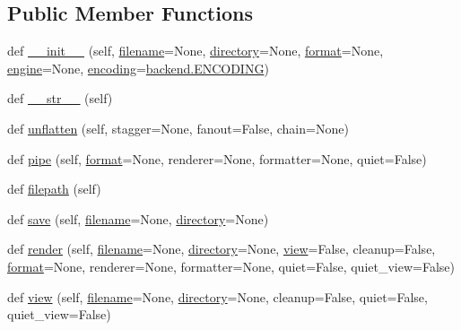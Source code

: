 \subsection*{Public Member Functions}
\begin{DoxyCompactItemize}
\item 
def \hyperlink{classgraphviz_1_1files_1_1File_a84665997ab9877bbfe2fb7cb85f38425}{\+\_\+\+\_\+init\+\_\+\+\_\+} (self, \hyperlink{classgraphviz_1_1files_1_1File_ad8357bf1553bf74f1d05954c0a0986a8}{filename}=None, \hyperlink{classgraphviz_1_1files_1_1File_a17fd3abb3628eca94effe35cf1237a73}{directory}=None, \hyperlink{classgraphviz_1_1files_1_1File_acd2dce8967c8ff4c00ad6c47872dc340}{format}=None, \hyperlink{classgraphviz_1_1files_1_1File_aabc771621d8e81fccc4003231716e9cf}{engine}=None, \hyperlink{classgraphviz_1_1files_1_1File_aec4aaf697774bce61c327584985eb42b}{encoding}=\hyperlink{namespacegraphviz_1_1backend_aaa5c3555a484c96a0b0e5356ce3a577d}{backend.\+E\+N\+C\+O\+D\+I\+NG})
\item 
def \hyperlink{classgraphviz_1_1files_1_1File_abd2eb2b419c616b0d99292f35dbfcc22}{\+\_\+\+\_\+str\+\_\+\+\_\+} (self)
\item 
def \hyperlink{classgraphviz_1_1files_1_1File_adbb901a504e9b3cd76b5b24bb10fc394}{unflatten} (self, stagger=None, fanout=False, chain=None)
\item 
def \hyperlink{classgraphviz_1_1files_1_1File_a695c8a9d1d10e6cca954e4efb6f63e6b}{pipe} (self, \hyperlink{classgraphviz_1_1files_1_1File_acd2dce8967c8ff4c00ad6c47872dc340}{format}=None, renderer=None, formatter=None, quiet=False)
\item 
def \hyperlink{classgraphviz_1_1files_1_1File_aa708befe2f6173e2599aa5c4e3ae10b2}{filepath} (self)
\item 
def \hyperlink{classgraphviz_1_1files_1_1File_aed3d654da952a817b9a070c34d13d813}{save} (self, \hyperlink{classgraphviz_1_1files_1_1File_ad8357bf1553bf74f1d05954c0a0986a8}{filename}=None, \hyperlink{classgraphviz_1_1files_1_1File_a17fd3abb3628eca94effe35cf1237a73}{directory}=None)
\item 
def \hyperlink{classgraphviz_1_1files_1_1File_a7a3b4fc4e816c395bf3878b5cadc44d3}{render} (self, \hyperlink{classgraphviz_1_1files_1_1File_ad8357bf1553bf74f1d05954c0a0986a8}{filename}=None, \hyperlink{classgraphviz_1_1files_1_1File_a17fd3abb3628eca94effe35cf1237a73}{directory}=None, \hyperlink{classgraphviz_1_1files_1_1File_a5595a991fd13abf5bcb6188f81ac5abd}{view}=False, cleanup=False, \hyperlink{classgraphviz_1_1files_1_1File_acd2dce8967c8ff4c00ad6c47872dc340}{format}=None, renderer=None, formatter=None, quiet=False, quiet\+\_\+view=False)
\item 
def \hyperlink{classgraphviz_1_1files_1_1File_a5595a991fd13abf5bcb6188f81ac5abd}{view} (self, \hyperlink{classgraphviz_1_1files_1_1File_ad8357bf1553bf74f1d05954c0a0986a8}{filename}=None, \hyperlink{classgraphviz_1_1files_1_1File_a17fd3abb3628eca94effe35cf1237a73}{directory}=None, cleanup=False, quiet=False, quiet\+\_\+view=False)
\end{DoxyCompactItemize}
